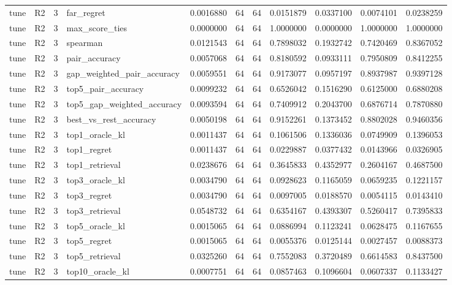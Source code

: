 \begin{tabular}{llrlrrrrrrr}
tune & R2 & 3 & far_regret & 0.0016880 & 64 & 64 & 0.0151879 & 0.0337100 & 0.0074101 & 0.0238259 \\
tune & R2 & 3 & max_score_ties & 0.0000000 & 64 & 64 & 1.0000000 & 0.0000000 & 1.0000000 & 1.0000000 \\
tune & R2 & 3 & spearman & 0.0121543 & 64 & 64 & 0.7898032 & 0.1932742 & 0.7420469 & 0.8367052 \\
tune & R2 & 3 & pair_accuracy & 0.0057068 & 64 & 64 & 0.8180592 & 0.0933111 & 0.7950809 & 0.8412255 \\
tune & R2 & 3 & gap_weighted_pair_accuracy & 0.0059551 & 64 & 64 & 0.9173077 & 0.0957197 & 0.8937987 & 0.9397128 \\
tune & R2 & 3 & top5_pair_accuracy & 0.0099232 & 64 & 64 & 0.6526042 & 0.1516290 & 0.6125000 & 0.6880208 \\
tune & R2 & 3 & top5_gap_weighted_accuracy & 0.0093594 & 64 & 64 & 0.7409912 & 0.2043700 & 0.6876714 & 0.7870880 \\
tune & R2 & 3 & best_vs_rest_accuracy & 0.0050198 & 64 & 64 & 0.9152261 & 0.1373452 & 0.8802028 & 0.9460356 \\
tune & R2 & 3 & top1_oracle_kl & 0.0011437 & 64 & 64 & 0.1061506 & 0.1336036 & 0.0749909 & 0.1396053 \\
tune & R2 & 3 & top1_regret & 0.0011437 & 64 & 64 & 0.0229887 & 0.0377432 & 0.0143966 & 0.0326905 \\
tune & R2 & 3 & top1_retrieval & 0.0238676 & 64 & 64 & 0.3645833 & 0.4352977 & 0.2604167 & 0.4687500 \\
tune & R2 & 3 & top3_oracle_kl & 0.0034790 & 64 & 64 & 0.0928623 & 0.1165059 & 0.0659235 & 0.1221157 \\
tune & R2 & 3 & top3_regret & 0.0034790 & 64 & 64 & 0.0097005 & 0.0188570 & 0.0054115 & 0.0143410 \\
tune & R2 & 3 & top3_retrieval & 0.0548732 & 64 & 64 & 0.6354167 & 0.4393307 & 0.5260417 & 0.7395833 \\
tune & R2 & 3 & top5_oracle_kl & 0.0015065 & 64 & 64 & 0.0886994 & 0.1123241 & 0.0628475 & 0.1167655 \\
tune & R2 & 3 & top5_regret & 0.0015065 & 64 & 64 & 0.0055376 & 0.0125144 & 0.0027457 & 0.0088373 \\
tune & R2 & 3 & top5_retrieval & 0.0325260 & 64 & 64 & 0.7552083 & 0.3720489 & 0.6614583 & 0.8437500 \\
tune & R2 & 3 & top10_oracle_kl & 0.0007751 & 64 & 64 & 0.0857463 & 0.1096604 & 0.0607337 & 0.1133427 \\

\end{tabular}
